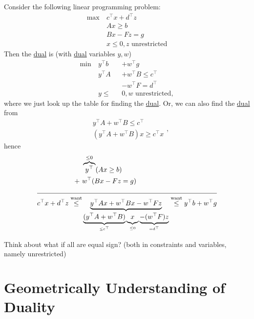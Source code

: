 \begin{eg}
	Consider the following linear programming problem:
	\[
		\begin{aligned}
			\max~ & c^{\top}x+d^{\top}z            \\
			      & Ax\geq b                       \\
			      & Bx - Fz = g                    \\
			      & x\leq 0, z\text{ unrestricted}
		\end{aligned}
	\]
	Then the \hyperref[def:dual]{dual} is (with \hyperref[def:dual]{dual} variables \(y, w\))
	\[
		\begin{alignedat}{3}
			\min~ & y^{\top}b   &&+w^{\top}g            \\
			& y^{\top}A  &&+w^{\top}B  \leq c^{\top} \\
			& &&-w^{\top}F = d^{\top}    \\
			& y\leq &&0, w \text{ unrestricted},
		\end{alignedat}
	\]
	where we just look up the table for finding the \hyperref[def:dual]{dual}. Or, we can also find the \hyperref[def:dual]{dual} from
	\[
		\begin{split}
			&y^{\top} A + w^{\top} B\leq c^{\top}\\
			&(y^{\top} A+w^{\top} B)x\geq c^{\top} x
		\end{split},
	\]
	hence
	\[
		\begin{split}
			&\overbrace{y^{\top}}^{\leq 0}(Ax\geq b)\\
			+\ &w^{\top}(Bx - Fz = g)\\
			\cline{1-2}
			c^{\top}x + d^{\top}z\overset{\text{want}}{\leq}&\underbrace{y^{\top}Ax + w^{\top}Bx - w^{\top} Fz}_{\underbrace{(y^{\top} A + w^{\top} B)}_{\leq c^{\top}}\underbrace{\vphantom{y^{\top}A}x}_{\leq 0} \underbrace{- (w^{\top} F)z}_{=d^{\top}}} \overset{\text{want}}{\leq} y^{\top}b+w^{\top}g
		\end{split}
	\]
\end{eg}
\begin{remark}
	Think about what if all are equal sign? (both in constraints and variables, namely unrestricted)
\end{remark}

\section{Geometrically Understanding of Duality}
